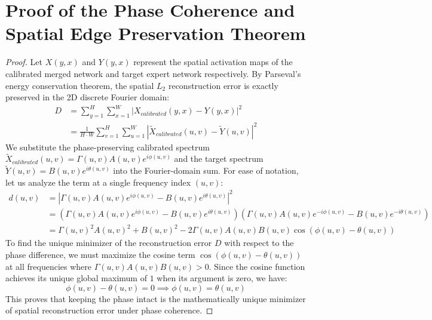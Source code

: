 \documentclass{article}
\theoremstyle{plain}
\theoremstyle{definition}
\theoremstyle{remark}
\begin{document}
\section{Proof of the Phase Coherence and Spatial Edge Preservation Theorem}
\label{app:proof_phase_coherence}
\begin{proof}
  Let $X(y, x)$ and $Y(y, x)$ represent the spatial activation maps of the calibrated merged network and target expert network respectively. By Parseval's energy conservation theorem, the spatial $L_2$ reconstruction error is exactly preserved in the 2D discrete Fourier domain:
  \begin{align}
    D &= \sum_{y=1}^H \sum_{x=1}^W \left| X_{calibrated}(y, x) - Y(y, x) \right|^2 \nonumber \\
    &= \frac{1}{H \cdot W} \sum_{v=1}^H \sum_{u=1}^W \left| \tilde{X}_{calibrated}(u, v) - \tilde{Y}(u, v) \right|^2
  \end{align}
  We substitute the phase-preserving calibrated spectrum $\tilde{X}_{calibrated}(u, v) = \Gamma(u, v) A(u, v) e^{i \phi(u, v)}$ and the target spectrum $\tilde{Y}(u, v) = B(u, v) e^{i \theta(u, v)}$ into the Fourier-domain sum. For ease of notation, let us analyze the term at a single frequency index $(u, v)$:
  \begin{align}
    d(u, v) &= \left| \Gamma(u, v) A(u, v) e^{i \phi(u, v)} - B(u, v) e^{i \theta(u, v)} \right|^2 \nonumber \\
    &= \left( \Gamma(u, v) A(u, v) e^{i \phi(u, v)} - B(u, v) e^{i \theta(u, v)} \right) \left( \Gamma(u, v) A(u, v) e^{-i \phi(u, v)} - B(u, v) e^{-i \theta(u, v)} \right) \nonumber \\
    &= \Gamma(u, v)^2 A(u, v)^2 + B(u, v)^2 - 2 \Gamma(u, v) A(u, v) B(u, v) \cos\left( \phi(u, v) - \theta(u, v) \right)
  \end{align}
  To find the unique minimizer of the reconstruction error $D$ with respect to the phase difference, we must maximize the cosine term $\cos\left( \phi(u, v) - \theta(u, v) \right)$ at all frequencies where $\Gamma(u, v) A(u, v) B(u, v) > 0$. Since the cosine function achieves its unique global maximum of $1$ when its argument is zero, we have:
  \begin{equation}
    \phi(u, v) - \theta(u, v) = 0 \implies \phi(u, v) = \theta(u, v)
  \end{equation}
  This proves that keeping the phase intact is the mathematically unique minimizer of spatial reconstruction error under phase coherence.
  

\end{proof}
\end{document}
